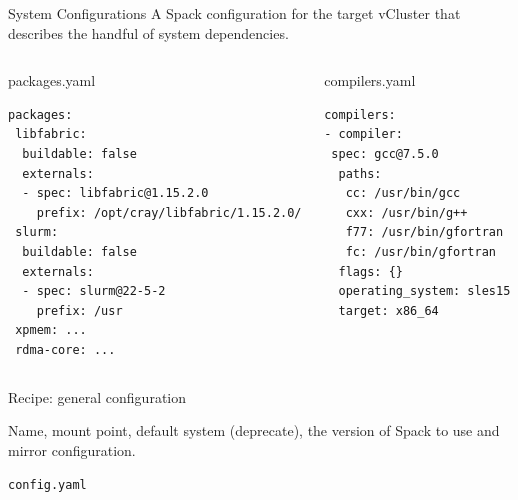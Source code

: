 \documentclass[aspectratio=43]{beamer}
\begin{document}
\begin{frame}[fragile]{System Configurations}
    A Spack configuration for the target vCluster that describes the handful of system dependencies.

    \begin{columns}[T]
        \begin{column}{0.5\textwidth}
        \begin{codecolumn}{packages.yaml}
            \begin{lstlisting}[style=talkyaml]
packages:
 libfabric:
  buildable: false
  externals:
  - spec: libfabric@1.15.2.0
    prefix: /opt/cray/libfabric/1.15.2.0/
 slurm:
  buildable: false
  externals:
  - spec: slurm@22-5-2
    prefix: /usr
 xpmem: ...
 rdma-core: ...
            \end{lstlisting}
        \end{codecolumn}
        \end{column}
        \begin{column}{0.5\textwidth}
        \begin{codecolumn}{compilers.yaml}
            \begin{lstlisting}[style=talkyaml]
compilers:
- compiler:
 spec: gcc@7.5.0
  paths:
   cc: /usr/bin/gcc
   cxx: /usr/bin/g++
   f77: /usr/bin/gfortran
   fc: /usr/bin/gfortran
  flags: {}
  operating_system: sles15
  target: x86_64
            \end{lstlisting}
        \end{codecolumn}
        \end{column}
    \end{columns}
\end{frame}

\begin{frame}[fragile]{Recipe: general configuration}

Name, mount point, default system (deprecate), the version of Spack to use and mirror configuration.

\begin{code}{\lstinline{config.yaml}}

\end{code}

\end{frame}
\end{document}
